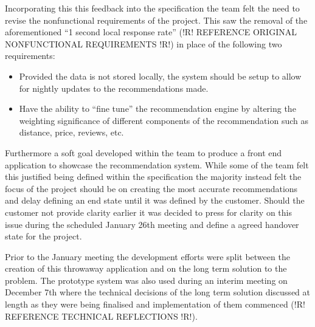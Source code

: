 \documentclass{l3proj}
\begin{document}
Incorporating this this feedback into the specification  the team felt the need to revise the nonfunctional requirements of the project. This saw the removal of the aforementioned “1 second local response rate” (!R! REFERENCE ORIGINAL NONFUNCTIONAL REQUIREMENTS !R!) in place of the following two requirements:

\begin{itemize}
\item Provided the data is not stored locally, the system should be setup to allow for nightly updates to the recommendations made.
\item Have the ability to “fine tune” the recommendation engine by altering the weighting significance of different components of the recommendation such as distance, price, 
reviews, etc.
\end{itemize}

Furthermore a soft goal developed within the team to produce a front end application to showcase the recommendation system. While some of the team felt this justified being defined within the specification the majority instead felt the focus of the project should be on creating the most accurate recommendations and delay defining an end state until it was defined by the customer. Should the customer not provide clarity earlier it was decided to press for clarity on this issue during the scheduled January 26th meeting and define a agreed handover state for the project.

Prior to the January meeting the development efforts were split between the creation of this throwaway application and on the long term solution to the problem. The prototype system was also used during an interim meeting on December 7th where the technical decisions of the long term solution discussed at length as they were being finalised and implementation of them commenced (!R! REFERENCE TECHNICAL REFLECTIONS !R!).  


\end{document}

